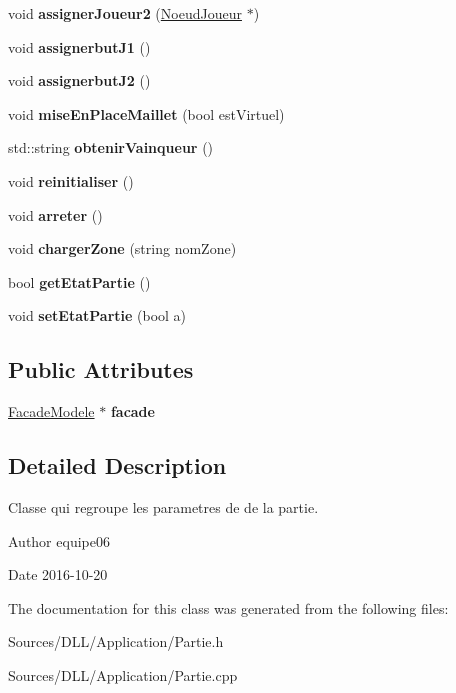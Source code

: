 \begin{DoxyCompactItemize}
\item 
void {\bfseries assigner\+Joueur2} (\hyperlink{class_noeud_joueur}{Noeud\+Joueur} $\ast$)
\item 
void {\bfseries assignerbut\+J1} ()
\item 
void {\bfseries assignerbut\+J2} ()
\item 
void {\bfseries mise\+En\+Place\+Maillet} (bool est\+Virtuel)
\item 
std\+::string {\bfseries obtenir\+Vainqueur} ()
\item 
void {\bfseries reinitialiser} ()
\item 
void {\bfseries arreter} ()
\item 
\hypertarget{class_partie_ac0747c32bd176efc2993a23100a44a0a}{}\label{class_partie_ac0747c32bd176efc2993a23100a44a0a} 
void {\bfseries charger\+Zone} (string nom\+Zone)
\item 
\hypertarget{class_partie_aa4e3abdd7d14f8d8e3fc1af5f1cdbdf8}{}\label{class_partie_aa4e3abdd7d14f8d8e3fc1af5f1cdbdf8} 
bool {\bfseries get\+Etat\+Partie} ()
\item 
\hypertarget{class_partie_ab88eb7e47b3da834363f2534786211fb}{}\label{class_partie_ab88eb7e47b3da834363f2534786211fb} 
void {\bfseries set\+Etat\+Partie} (bool a)
\end{DoxyCompactItemize}
\subsection*{Public Attributes}
\begin{DoxyCompactItemize}
\item 
\hypertarget{class_partie_a7d70f99d8f87219f2ddeaebc9773a623}{}\label{class_partie_a7d70f99d8f87219f2ddeaebc9773a623} 
\hyperlink{class_facade_modele}{Facade\+Modele} $\ast$ {\bfseries facade}
\end{DoxyCompactItemize}


\subsection{Detailed Description}
Classe qui regroupe les parametres de de la partie. 

\begin{DoxyAuthor}{Author}
equipe06 
\end{DoxyAuthor}
\begin{DoxyDate}{Date}
2016-\/10-\/20 
\end{DoxyDate}


The documentation for this class was generated from the following files\+:\begin{DoxyCompactItemize}
\item 
Sources/\+D\+L\+L/\+Application/Partie.\+h\item 
Sources/\+D\+L\+L/\+Application/Partie.\+cpp\end{DoxyCompactItemize}
